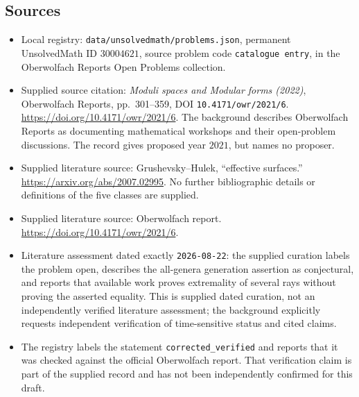 \documentclass[11pt]{article}
\begin{document}
\subsection{Sources}
\begin{itemize}
\item Local registry: \texttt{data/unsolvedmath/problems.json}, permanent UnsolvedMath ID \(30004621\), source problem code \texttt{catalogue entry}, in the Oberwolfach Reports Open Problems collection.
\item Supplied source citation: \emph{Moduli spaces and Modular forms (2022)}, Oberwolfach Reports, pp.\ 301--359, DOI \texttt{10.4171/owr/2021/6}. \url{https://doi.org/10.4171/owr/2021/6}. The background describes Oberwolfach Reports as documenting mathematical workshops and their open-problem discussions. The record gives proposed year \(2021\), but names no proposer.
\item Supplied literature source: Grushevsky--Hulek, ``effective surfaces.'' \url{https://arxiv.org/abs/2007.02995}. No further bibliographic details or definitions of the five classes are supplied.
\item Supplied literature source: Oberwolfach report. \url{https://doi.org/10.4171/owr/2021/6}.
\item Literature assessment dated exactly \texttt{2026-08-22}: the supplied curation labels the problem open, describes the all-genera generation assertion as conjectural, and reports that available work proves extremality of several rays without proving the asserted equality. This is supplied dated curation, not an independently verified literature assessment; the background explicitly requests independent verification of time-sensitive status and cited claims.
\item The registry labels the statement \texttt{corrected\_verified} and reports that it was checked against the official Oberwolfach report. That verification claim is part of the supplied record and has not been independently confirmed for this draft.
\end{itemize}
\end{document}

